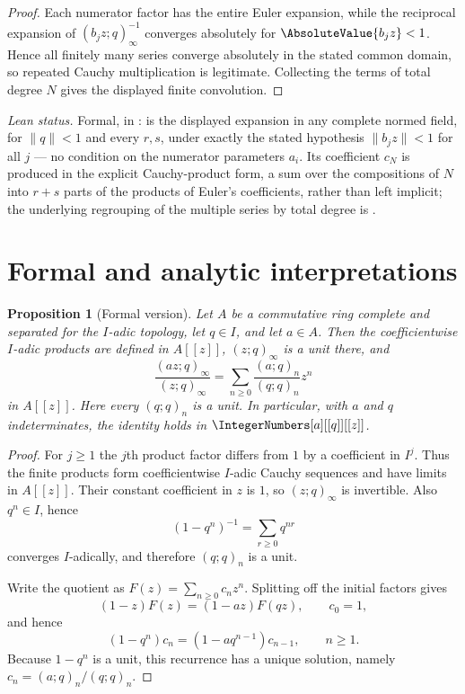 \documentclass[11pt,a4paper,oneside,openany]{book}
\newtheorem{proposition}[proposition]{Proposition}
\theoremstyle{definition}
\theoremstyle{remark}
\begin{document}
\begin{proof}
Each numerator factor has the entire Euler expansion, while the reciprocal
expansion of $(b_jz;q)_\infty^{-1}$ converges absolutely for
$\AbsoluteValue{b_jz}<1$.  Hence all finitely many series converge absolutely
in the stated common domain, so repeated Cauchy multiplication is legitimate.
Collecting the terms of total degree $N$ gives the displayed finite
convolution.
\end{proof}

\emph{Lean status.}  Formal, in :
 is the displayed expansion in any complete normed field, for
$\lVert q\rVert<1$ and every $r,s$, under exactly the stated hypothesis
$\lVert b_jz\rVert<1$ for all $j$ --- no condition on the numerator parameters $a_i$.  Its
coefficient $c_N$ is produced in the explicit Cauchy-product form, a sum over the compositions of
$N$ into $r+s$ parts of the products of Euler's coefficients, rather than left implicit; the
underlying regrouping of the multiple series by total degree is
.


\section{Formal and analytic interpretations}

\begin{proposition}[Formal version]\label{prop:formal-qbinomial}
Let $A$ be a commutative ring complete and separated for the $I$-adic
topology, let $q\in I$, and let $a\in A$.  Then the coefficientwise $I$-adic
products are defined in $A[[z]]$, $(z;q)_\infty$ is a unit there, and
\[
 \frac{(az;q)_\infty}{(z;q)_\infty}
 =\sum_{n\ge0}\frac{(a;q)_n}{(q;q)_n}z^n
\]
in $A[[z]]$.  Here every $(q;q)_n$ is a unit.  In particular, with $a$ and
$q$ indeterminates, the identity holds in
$\IntegerNumbers[a][[q]][[z]]$.
\end{proposition}

\begin{proof}
For $j\ge1$ the $j$th product factor differs from $1$ by a coefficient in
$I^j$.  Thus the finite products form coefficientwise $I$-adic Cauchy
sequences and have limits in $A[[z]]$.  Their constant coefficient in $z$ is
$1$, so $(z;q)_\infty$ is invertible.  Also $q^n\in I$, hence
\[
 (1-q^n)^{-1}=\sum_{r\ge0}q^{nr}
\]
converges $I$-adically, and therefore $(q;q)_n$ is a unit.

Write the quotient as $F(z)=\sum_{n\ge0}c_nz^n$.  Splitting off the initial
factors gives
\[
 (1-z)F(z)=(1-az)F(qz),\qquad c_0=1,
\]
and hence
\[
 (1-q^n)c_n=(1-aq^{n-1})c_{n-1},
 \qquad n\ge1.
\]
Because $1-q^n$ is a unit, this recurrence has a unique solution, namely
$c_n=(a;q)_n/(q;q)_n$.
\end{proof}
\end{document}
